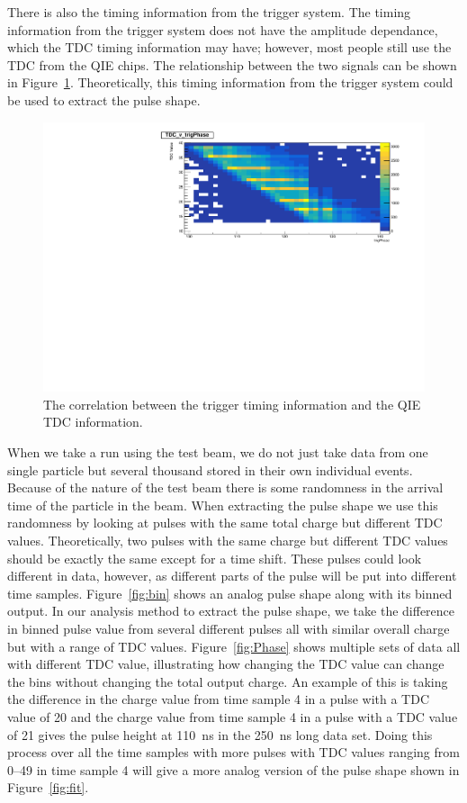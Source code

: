 There is also the timing information from the trigger system. The timing information from the trigger system does not have the amplitude dependance, which the TDC timing information may have; however, most people still use the TDC from the QIE chips. The relationship between the two signals can be shown in Figure~\ref{fig:tdc}. Theoretically, this timing information from the trigger system could be used to extract the pulse shape.

\begin{figure}
\centering
\includegraphics[width=\linewidth]{Figures/TDCvTrigPhase.pdf}
\caption{The correlation between the trigger timing information and the QIE TDC information.}
\label{fig:tdc}
\end{figure}

When we take a run using the test beam, we do not just take data from one single particle but several thousand stored in their own individual events. Because of the nature of the test beam there is some randomness in the arrival time of the particle in the beam. When extracting the pulse shape we use this randomness by looking at pulses with the same total charge but different TDC values. Theoretically, two pulses with the same charge but different TDC values should be exactly the same except for a time shift. These pulses could look different in data, however, as different parts of the pulse will be put into different time samples. Figure~\ref{fig:bin} shows an analog pulse shape along with its binned output. In our analysis method to extract the pulse shape, we take the difference in binned pulse value from several different pulses all with similar overall charge but with a range of TDC values. Figure~\ref{fig:Phase} shows multiple sets of data all with different TDC value, illustrating how changing the TDC value can change the bins without changing the total output charge. An example of this is taking the difference in the charge value from time sample 4 in a pulse with a TDC value of 20 and the charge value from time sample 4 in a pulse with a TDC value of 21 gives the pulse height at 110~ns in the 250~ns long data set. Doing this process over all the time samples with more pulses with TDC values ranging from 0--49 in time sample 4 will give a more analog version of the pulse shape shown in Figure~\ref{fig:fit}.

